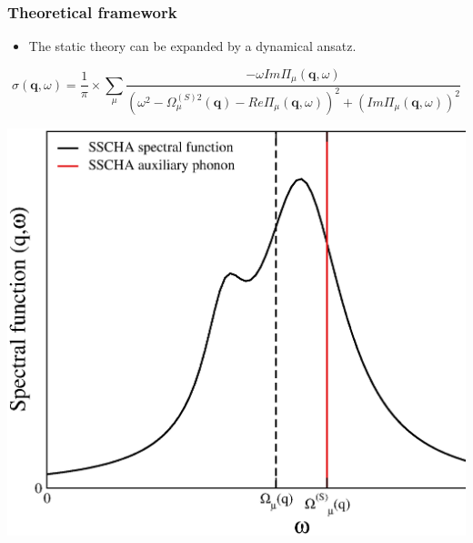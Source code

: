 \documentclass{beamer}
\begin{document}
\begin{frame}

 \frametitle{Theoretical framework}
 \begin{itemize}
 \item The static theory can be expanded by a dynamical ansatz.
 \end{itemize}
 \begin{equation}
	 \sigma(\mathbf{q},\omega)=\frac{1}{\pi}\times\sum_{\mu}\frac{-\omega Im\Pi_{\mu}(\mathbf{q},\omega)}{(\omega^{2}-\Omega^{(S)2}_{\mu}
 (\mathbf{q})-Re\Pi_{\mu}(\mathbf{q},\omega))^{2}+(Im\Pi_{\mu}(\mathbf{q},\omega))^{2}}
 \nonumber
 \end{equation}
 \begin{center}
  \includegraphics[width=0.65\linewidth]{Pictures/THEORY/ins-toy1.eps}
 \end{center}

\end{frame}

\end{document}
